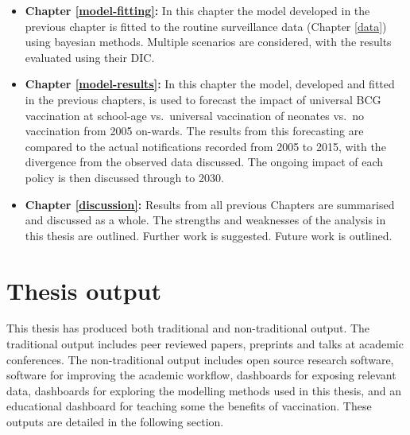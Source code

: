 \documentclass[11pt,twoside]{bristolthesis}
\begin{document}
\begin{itemize}
  \item
    \textbf{Chapter \ref{model-fitting}:} In this chapter the model developed in the previous chapter is fitted to the routine surveillance data (Chapter \ref{data}) using bayesian methods. Multiple scenarios are considered, with the results evaluated using their DIC.
  \item
    \textbf{Chapter \ref{model-results}:} In this chapter the model, developed and fitted in the previous chapters, is used to forecast the impact of universal BCG vaccination at school-age vs.~universal vaccination of neonates vs.~no vaccination from 2005 on-wards. The results from this forecasting are compared to the actual notifications recorded from 2005 to 2015, with the divergence from the observed data discussed. The ongoing impact of each policy is then discussed through to 2030.
  \item
    \textbf{Chapter \ref{discussion}:} Results from all previous Chapters are summarised and discussed as a whole. The strengths and weaknesses of the analysis in this thesis are outlined. Further work is suggested. Future work is outlined.
  \end{itemize}
  \hypertarget{thesis-output}{%
  \section{Thesis output}\label{thesis-output}}
  
  This thesis has produced both traditional and non-traditional output. The traditional output includes peer reviewed papers, preprints and talks at academic conferences. The non-traditional output includes open source research software, software for improving the academic workflow, dashboards for exposing relevant data, dashboards for exploring the modelling methods used in this thesis, and an educational dashboard for teaching some the benefits of vaccination. These outputs are detailed in the following section.
  
\end{document}
